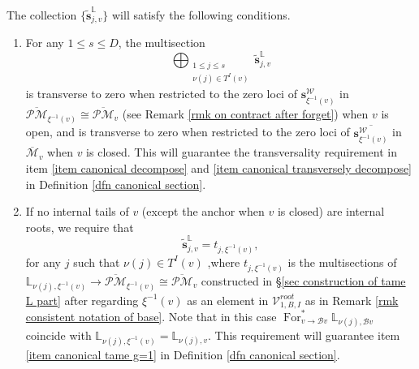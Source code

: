 \documentclass[11pt]{amsart}
\theoremstyle{definition}
\theoremstyle{remark}
\newcommand{\oPMb}{{\overline{\mathcal{PM}}}}
\newcommand{\<}{\left<}
\renewcommand{\>}{\right>}
\numberwithin{equation}{section}
\def\Mbar{{\overline{\mathcal M}}}
\begin{document}
    The collection $\{\tilde{\bm{s}}^{\mathbb L}_{j,v}\}$ will satisfy the following conditions.

    \begin{enumerate}
    \item For any $1\le s \le D$, the multisection 
    $$\bigoplus_{\substack{1\le j \le s\\ \nu(j)\in T^I(v)}}\tilde{\bm{s}}^{\mathbb L}_{j,v}$$ 
    is transverse to zero when restricted to the zero loci of $\bm{s}^{\mathcal W}_{\xi^{-1}(v)}$ in $\oPMb_{\xi^{-1}(v)}\cong \oPMb_v$ (see Remark \ref{rmk on contract after forget}) when $v$ is open, and is transverse to zero when restricted to the zero loci of $\overline{\bm{s}^{\mathcal W}_{\xi^{-1}(v)}}$ in $\Mbar_{ v}$ when $v$ is closed. This will guarantee the transversality requirement in item \ref{item canonical decompose} and \ref{item canonical transversely decompose} in Definition \ref{dfn canonical section}.
    
    \item If no internal tails of $v$ (except the anchor when $v$ is closed) are  internal roots,  we require that
    \begin{equation}\label{eq canonical L part in case when no internal root}
    \tilde{\bm s}^{\mathbb L}_{j,v}=  t_{j, \xi^{-1}(v)},
    \end{equation}
    for any $j$ such that $\nu(j)\in T^I(v)$ ,where $t_{j, \xi^{-1}(v)}$ is the multisections of $\mathbb L_{\nu(j),\xi^{-1}(v)}\to \oPMb_{\xi^{-1}(v)}\cong \oPMb_v$ constructed in \S \ref{sec construction of tame L part} after regarding $\xi^{-1}(v)$ as an element in $\mathcal V_{1,B,I}^{root}$ as in Remark \ref{rmk consistent notation of base}.
    Note that in this case $ \operatorname{For}^*_{v\to \mathcal B v}\mathbb L_{\nu(j),\mathcal B v}$ coincide with $ \mathbb L_{\nu(j), \xi^{-1}(v)}=\mathbb L_{\nu(j), v}$.
    This requirement will guarantee item \ref{item canonical tame g=1} in Definition \ref{dfn canonical section}.
    


\end{enumerate}
\end{document}

